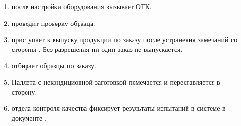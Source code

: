 \begin{enumerate}


 \item \operator после настройки оборудования  вызывает \laborant ОТК.
 \item \laborant проводит проверку образца.
 \item \operator приступает к выпуску продукции по заказу после устранения замечаний со стороны \laborant. Без разрешения \laborant ни один заказ не выпускается. 
 
\item \laborant отбирает образцы по заказу.
\item Паллета  с некондиционной заготовкой помечается и переставляется в сторону.
\item \laborant отдела контроля качества фиксирует результаты испытаний в системе \gofro  в документе .

\end{enumerate}